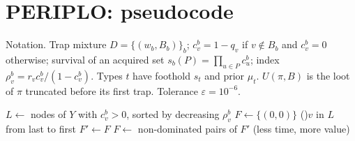 \documentclass{llncs}
\begin{document}
\section*{PERIPLO: pseudocode}

\noindent Notation. Trap mixture $D=\{(w_b,B_b)\}_b$; $c_v^b=1-q_v$ if $v\notin B_b$ and $c_v^b=0$ otherwise; survival of an acquired set $s_b(P)=\prod_{u\in P}c_u^b$; index $\rho_v^b=r_vc_v^b/(1-c_v^b)$. Types $t$ have foothold $s_t$ and prior $\mu_t$. $U(\pi,B)$ is the loot of $\pi$ truncated before its first trap. Tolerance $\varepsilon=10^{-6}$.

\begin{algorithm}[h]
\caption{\textsc{IndexKnapsack}: completion bound of Lemma~1 for one scenario $b$}\label{alg:knap}
$L\gets$ nodes of $Y$ with $c_v^b>0$, sorted by decreasing $\rho_v^b$\;
$F\gets\{(0,0)\}$ 
\ForEach(){$v$ in $L$ from last to first}{
  $F'\gets F$\;
  $F\gets$ non-dominated pairs of $F'$ (less time, more value)\;
}
\;
\end{algorithm}
\end{document}
